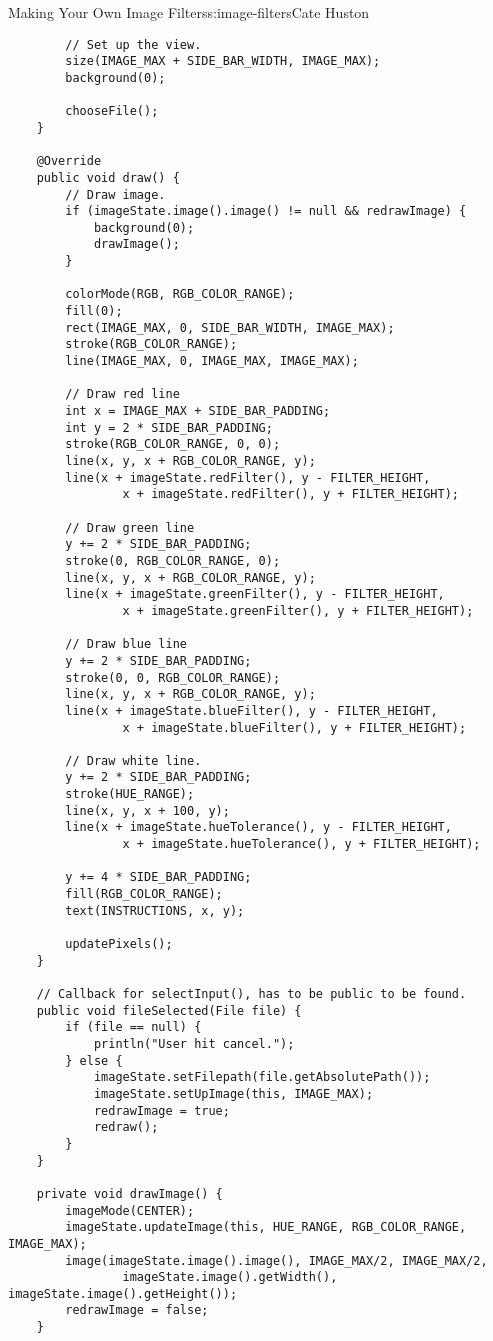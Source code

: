 \begin{aosachapter}{Making Your Own Image Filters}{s:image-filters}{Cate Huston}
\begin{verbatim}
        // Set up the view.
        size(IMAGE_MAX + SIDE_BAR_WIDTH, IMAGE_MAX);
        background(0);

        chooseFile();
    }

    @Override
    public void draw() {
        // Draw image.
        if (imageState.image().image() != null && redrawImage) {
            background(0);
            drawImage();
        }

        colorMode(RGB, RGB_COLOR_RANGE);
        fill(0);
        rect(IMAGE_MAX, 0, SIDE_BAR_WIDTH, IMAGE_MAX);
        stroke(RGB_COLOR_RANGE);
        line(IMAGE_MAX, 0, IMAGE_MAX, IMAGE_MAX);

        // Draw red line
        int x = IMAGE_MAX + SIDE_BAR_PADDING;
        int y = 2 * SIDE_BAR_PADDING;
        stroke(RGB_COLOR_RANGE, 0, 0);
        line(x, y, x + RGB_COLOR_RANGE, y);
        line(x + imageState.redFilter(), y - FILTER_HEIGHT,
                x + imageState.redFilter(), y + FILTER_HEIGHT);

        // Draw green line
        y += 2 * SIDE_BAR_PADDING;
        stroke(0, RGB_COLOR_RANGE, 0);
        line(x, y, x + RGB_COLOR_RANGE, y);
        line(x + imageState.greenFilter(), y - FILTER_HEIGHT,
                x + imageState.greenFilter(), y + FILTER_HEIGHT);

        // Draw blue line
        y += 2 * SIDE_BAR_PADDING;
        stroke(0, 0, RGB_COLOR_RANGE);
        line(x, y, x + RGB_COLOR_RANGE, y);
        line(x + imageState.blueFilter(), y - FILTER_HEIGHT,
                x + imageState.blueFilter(), y + FILTER_HEIGHT);

        // Draw white line.
        y += 2 * SIDE_BAR_PADDING;
        stroke(HUE_RANGE);
        line(x, y, x + 100, y);
        line(x + imageState.hueTolerance(), y - FILTER_HEIGHT,
                x + imageState.hueTolerance(), y + FILTER_HEIGHT);

        y += 4 * SIDE_BAR_PADDING;
        fill(RGB_COLOR_RANGE);
        text(INSTRUCTIONS, x, y);

        updatePixels();
    }

    // Callback for selectInput(), has to be public to be found.
    public void fileSelected(File file) {
        if (file == null) {
            println("User hit cancel.");
        } else {
            imageState.setFilepath(file.getAbsolutePath());
            imageState.setUpImage(this, IMAGE_MAX);
            redrawImage = true;
            redraw();
        }
    }

    private void drawImage() {
        imageMode(CENTER);
        imageState.updateImage(this, HUE_RANGE, RGB_COLOR_RANGE, IMAGE_MAX);
        image(imageState.image().image(), IMAGE_MAX/2, IMAGE_MAX/2, 
                imageState.image().getWidth(), imageState.image().getHeight());
        redrawImage = false;
    }


\end{verbatim}
\end{aosachapter}
